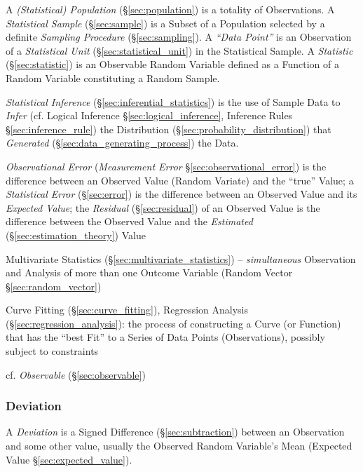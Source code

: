 \fist A \emph{(Statistical) Population} (\S\ref{sec:population}) is a totality
of Observations. A \emph{Statistical Sample} (\S\ref{sec:sample}) is
a Subset of a Population selected by a definite \emph{Sampling Procedure}
(\S\ref{sec:sampling}). A \emph{``Data Point''} is an Observation of a
\emph{Statistical Unit} (\S\ref{sec:statistical_unit}) in the Statistical
Sample. A \emph{Statistic} (\S\ref{sec:statistic}) is an Observable Random
Variable defined as a Function of a Random Variable constituting a Random
Sample.

\fist \emph{Statistical Inference} (\S\ref{sec:inferential_statistics}) is the
use of Sample Data to \emph{Infer} (cf. Logical Inference
\S\ref{sec:logical_inference}, Inference Rules \S\ref{sec:inference_rule}) the
Distribution (\S\ref{sec:probability_distribution}) that \emph{Generated}
(\S\ref{sec:data_generating_process}) the Data.

\fist \emph{Observational Error} (\emph{Measurement Error}
\S\ref{sec:observational_error}) is the
difference between an Observed Value (Random Variate) and the ``true'' Value;
a \emph{Statistical Error} (\S\ref{sec:error}) is the difference between an
Observed Value and its \emph{Expected Value};
the \emph{Residual} (\S\ref{sec:residual}) of an Observed Value is the
difference between the Observed Value and the \emph{Estimated}
(\S\ref{sec:estimation_theory}) Value

\fist Multivariate Statistics (\S\ref{sec:multivariate_statistics}) --
\emph{simultaneous} Observation and Analysis of more than one Outcome Variable
(Random Vector \S\ref{sec:random_vector})

\fist Curve Fitting (\S\ref{sec:curve_fitting}), Regression Analysis
(\S\ref{sec:regression_analysis}): the process of constructing a Curve (or
Function) that has the ``best Fit'' to a Series of Data Points (Observations),
possibly subject to constraints

\fist cf. \emph{Observable} (\S\ref{sec:observable})



\subsubsection{Deviation}\label{sec:deviation}

A \emph{Deviation} is a Signed Difference (\S\ref{sec:subtraction}) between an
Observation and some other value, usually the Observed Random Variable's Mean
(Expected Value \S\ref{sec:expected_value}).

